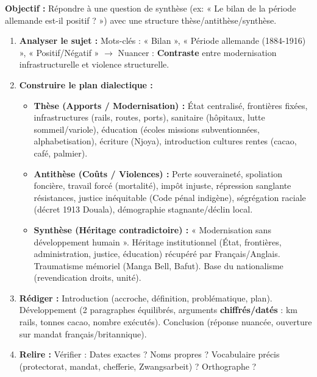 \documentclass[11pt]{article}
\begin{document}
\begin{methode}
\textbf{Objectif :} Répondre à une question de synthèse (ex: « Le bilan de la période allemande est-il positif ? ») avec une structure thèse/antithèse/synthèse.
\begin{enumerate}
    \item \textbf{Analyser le sujet :} Mots-clés : « Bilan », « Période allemande (1884-1916) », « Positif/Négatif » $\rightarrow$ Nuancer : \textbf{Contraste} entre modernisation infrastructurelle et violence structurelle.
    \item \textbf{Construire le plan dialectique :}
    \begin{itemize}
        \item \textbf{Thèse (Apports / Modernisation) :} État centralisé, frontières fixées, infrastructures (rails, routes, ports), sanitaire (hôpitaux, lutte sommeil/variole), éducation (écoles missions subventionnées, alphabetisation), écriture (Njoya), introduction cultures rentes (cacao, café, palmier).
        \item \textbf{Antithèse (Coûts / Violences) :} Perte souveraineté, spoliation foncière, travail forcé (mortalité), impôt injuste, répression sanglante résistances, justice inéquitable (Code pénal indigène), ségrégation raciale (décret 1913 Douala), démographie stagnante/déclin local.
        \item \textbf{Synthèse (Héritage contradictoire) :} « Modernisation sans développement humain ». Héritage institutionnel (État, frontières, administration, justice, éducation) récupéré par Français/Anglais. Traumatisme mémoriel (Manga Bell, Bafut). Base du nationalisme (revendication droits, unité).
    \end{itemize}
    \item \textbf{Rédiger :} Introduction (accroche, définition, problématique, plan). Développement (2 paragraphes équilibrés, arguments \textbf{chiffrés/datés} : km rails, tonnes cacao, nombre exécutés). Conclusion (réponse nuancée, ouverture sur mandat français/britannique).
    \item \textbf{Relire :} Vérifier : Dates exactes ? Noms propres ? Vocabulaire précis (protectorat, mandat, chefferie, Zwangsarbeit) ? Orthographe ?
\end{enumerate}
\end{methode}
\end{document}

